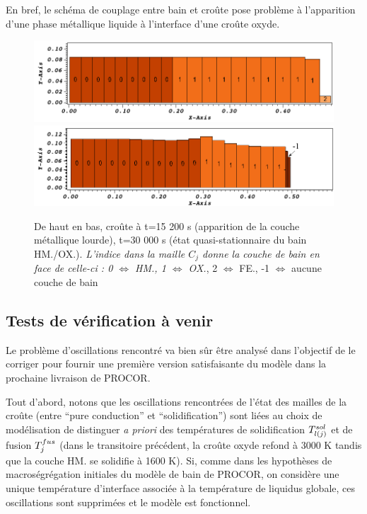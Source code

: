 En bref, le schéma de couplage entre bain et croûte pose problème à l'apparition d'une phase métallique liquide à l'interface d'une croûte oxyde.

\begin{figure}[H]
\centering
\includegraphics[width=\textwidth, keepaspectratio=true]{Figures/coriumCrust_15200.png} \\
\includegraphics[width=\textwidth, keepaspectratio=true]{Figures/coriumCrust_30000.png}
\caption{De haut en bas, croûte à t=15 200 s (apparition de la couche métallique lourde), t=30 000 s (état quasi-stationnaire du bain HM./OX.). \textit{L'indice dans la maille $C_j$ donne la couche de bain en face de celle-ci : 0 $\Leftrightarrow$ HM., 1 $\Leftrightarrow$ OX.}, 2  $\Leftrightarrow$ FE., -1 $\Leftrightarrow$ aucune couche de bain}
\label{fig:croutes_2}
\end{figure}

\subsection{Tests de vérification à venir}

Le problème d'oscillations rencontré va bien sûr être analysé dans l'objectif de le corriger pour fournir une première version satisfaisante du modèle dans la prochaine livraison de PROCOR.

Tout d'abord, notons que les oscillations rencontrées de l'état des mailles de la croûte (entre ``pure conduction'' et ``solidification'') sont liées au choix de modélisation de distinguer \textit{a priori} des températures de solidification $\temperature[sol]{l(j)}$ et de fusion $\temperature[fus]{j}$ (dans le transitoire précédent, la croûte oxyde refond à 3000 K tandis que la couche HM. se solidifie à 1600 K). Si, comme dans les hypothèses de macroségrégation initiales du modèle de bain de PROCOR, on considère une unique température d'interface associée à la température de liquidus globale, ces oscillations sont supprimées et le modèle est fonctionnel.

